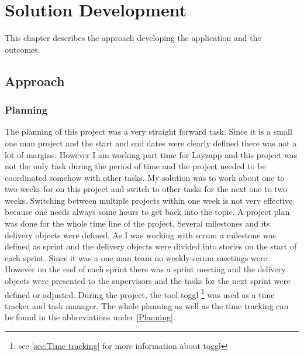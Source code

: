 
\chapter{Solution Development} %

\label{Solution Development} %



This chapter describes the approach developing the application and the outcomes.

\section{Approach}

\subsection{Planning}

The planning of this project was a very straight forward task. Since it is a small one man project and the start and end dates were clearly defined there was not a lot of margins.  However I am working part time for Layzapp and this project was not the only task during the period of time and the project needed to be coordinated somehow with other tasks. My solution was to work about one to two weeks for on this project and switch to other tasks for the next one to two weeks. Switching between multiple projects within one week is not very effective because one needs always some hours to get back into the topic. 
A project plan was done for the whole time line of the project. Several milestones and its delivery objects were defined. As I was working with scrum a milestone was defined as sprint and the delivery objects were divided into stories on the start of each sprint. Since it was a one man team no weekly scrum meetings were. However on the end of each sprint there was a sprint meeting and the delivery objects were presented to the supervisors and the tasks for the next sprint were defined or adjusted. During the project, the tool toggl \footnote{see \ref{sec:Time tracking}  for more information about toggl} was used as a time tracker and task manager. The whole planning as well as the time tracking can be found in the abbreviations under \ref{Planning}.

